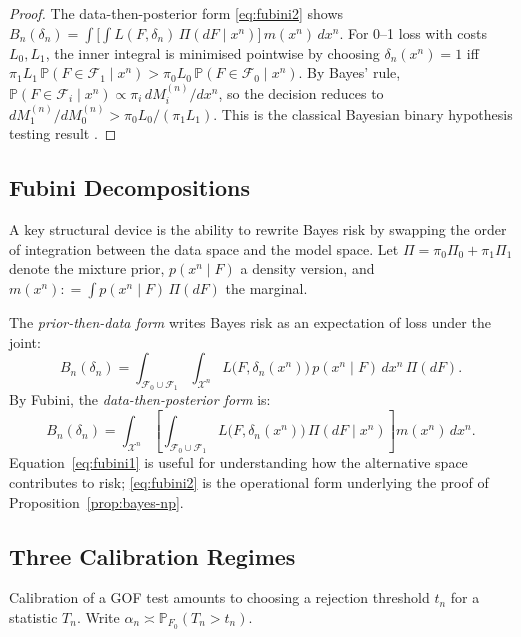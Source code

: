 \documentclass[11pt]{article}
\newcommand{\defeq}{\mathrel{\mathop:}=}
\newcommand{\calX}{\mathcal{X}}
\newcommand{\calF}{\mathcal{F}}
\newcommand{\1}{\mathbf{1}}
\newcommand{\PP}{\mathbb{P}}
\theoremstyle{plain}
\theoremstyle{definition}
\theoremstyle{remark}
\begin{document}
\begin{proof}
The data-then-posterior form \eqref{eq:fubini2} shows $B_n(\delta_n)=\int\bigl[\int L(F,\delta_n)\,\Pi(dF\mid x^n)\bigr]\,m(x^n)\,dx^n$.
For 0--1 loss with costs $L_0,L_1$, the inner integral is minimised pointwise by choosing $\delta_n(x^n)=1$ iff $\pi_1 L_1\,\PP(F\in\calF_1\mid x^n)>\pi_0 L_0\,\PP(F\in\calF_0\mid x^n)$.
By Bayes' rule, $\PP(F\in\calF_i\mid x^n)\propto \pi_i\,dM_i^{(n)}/dx^n$, so the decision reduces to $dM_1^{(n)}/dM_0^{(n)}>\pi_0 L_0/(\pi_1 L_1)$.
This is the classical Bayesian binary hypothesis testing result \citep[Ch.~4]{Berger1985}.
\end{proof}

\subsection{Fubini Decompositions}\label{subsec:fubini}

A key structural device is the ability to rewrite Bayes risk by swapping the order of integration between the data space and the model space.
Let $\Pi=\pi_0\Pi_0+\pi_1\Pi_1$ denote the mixture prior, $p(x^n\mid F)$ a density version, and $m(x^n) \defeq \int p(x^n\mid F)\,\Pi(dF)$ the marginal.

The \emph{prior-then-data form} writes Bayes risk as an expectation of loss under the joint:
\begin{equation}\label{eq:fubini1}
B_n(\delta_n)
=
\int_{\calF_0\cup\calF_1}
\int_{\calX^n}
L\!\big(F,\delta_n(x^n)\big)\, p(x^n\mid F)\, dx^n\, \Pi(dF).
\end{equation}
By Fubini, the \emph{data-then-posterior form} is:
\begin{equation}\label{eq:fubini2}
B_n(\delta_n)
=
\int_{\calX^n}
\left[
\int_{\calF_0\cup\calF_1}
L\!\big(F,\delta_n(x^n)\big)\,\Pi(dF\mid x^n)
\right]
m(x^n)\, dx^n.
\end{equation}
Equation~\eqref{eq:fubini1} is useful for understanding how the alternative space contributes to risk; \eqref{eq:fubini2} is the operational form underlying the proof of Proposition~\ref{prop:bayes-np}.


\subsection{Three Calibration Regimes}\label{subsec:three-regimes}

Calibration of a GOF test amounts to choosing a rejection threshold $t_n$ for a statistic $T_n$.
Write $\alpha_n \asymp \PP_{F_0}(T_n>t_n)$.
\end{document}
